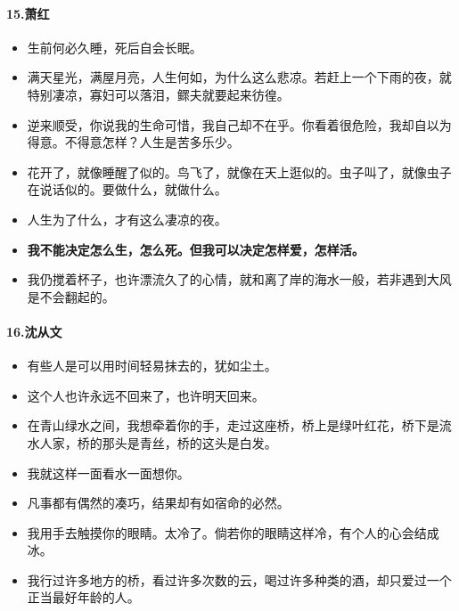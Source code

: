 \documentclass[UTF8,a4paper,8pt]{ctexbook}
\begin{document}
	\paragraph{15.萧红}
		\begin{itemize}
			\item 生前何必久睡，死后自会长眠。
			\item 满天星光，满屋月亮，人生何如，为什么这么悲凉。若赶上一个下雨的夜，就特别凄凉，寡妇可以落泪，鳏夫就要起来彷徨。
			\item 逆来顺受，你说我的生命可惜，我自己却不在乎。你看着很危险，我却自以为得意。不得意怎样？人生是苦多乐少。
			\item 花开了，就像睡醒了似的。鸟飞了，就像在天上逛似的。虫子叫了，就像虫子在说话似的。要做什么，就做什么。
			\item 人生为了什么，才有这么凄凉的夜。
			\item \textbf{我不能决定怎么生，怎么死。但我可以决定怎样爱，怎样活。}
			\item 我仍搅着杯子，也许漂流久了的心情，就和离了岸的海水一般，若非遇到大风是不会翻起的。
		\end{itemize}	
		
	\paragraph{16.沈从文}
		\begin{itemize}
			\item 有些人是可以用时间轻易抹去的，犹如尘土。
			\item 这个人也许永远不回来了，也许明天回来。
			\item 在青山绿水之间，我想牵着你的手，走过这座桥，桥上是绿叶红花，桥下是流水人家，桥的那头是青丝，桥的这头是白发。
			\item 我就这样一面看水一面想你。
			\item 凡事都有偶然的凑巧，结果却有如宿命的必然。
			\item 我用手去触摸你的眼睛。太冷了。倘若你的眼睛这样冷，有个人的心会结成冰。
			\item 我行过许多地方的桥，看过许多次数的云，喝过许多种类的酒，却只爱过一个正当最好年龄的人。
		\end{itemize}	
\end{document}
